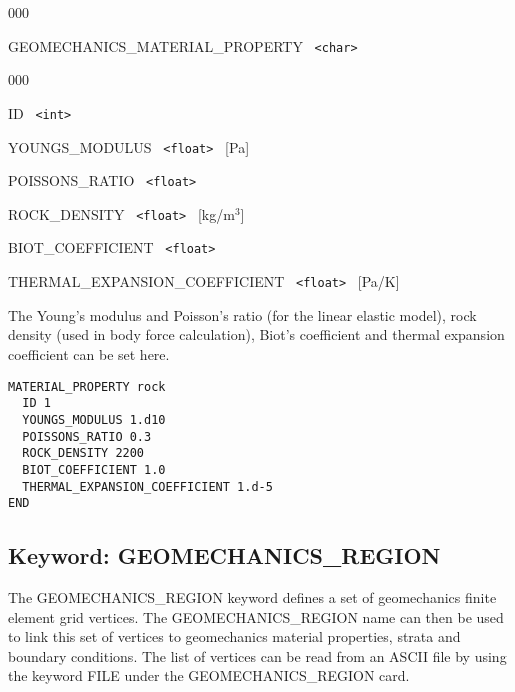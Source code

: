 \begin{deflist}{000}
\item[GEOMECHANICS\_MATERIAL\_PROPERTY] \ {\tt <char>}
\begin{deflist}{000}
\item[ID] \ {\tt <int>}
\item[YOUNGS\_MODULUS] \ {\tt <float>} \ [Pa]
\item[POISSONS\_RATIO] \ {\tt <float>}
\item[ROCK\_DENSITY] \ {\tt <float>} \ [kg/m$^3$]
\item[BIOT\_COEFFICIENT] \ {\tt <float>} 
\item[THERMAL\_EXPANSION\_COEFFICIENT] \ {\tt <float>} \ [Pa/K]
\end{deflist}
\item[\keyend]
\end{deflist}

 The Young's modulus and Poisson's ratio (for the linear elastic model), rock density (used in body force calculation), Biot's coefficient and thermal expansion coefficient can be set here.

\begin{mdframed}

\begin{verbatim}
MATERIAL_PROPERTY rock	 
  ID 1
  YOUNGS_MODULUS 1.d10
  POISSONS_RATIO 0.3
  ROCK_DENSITY 2200
  BIOT_COEFFICIENT 1.0
  THERMAL_EXPANSION_COEFFICIENT 1.d-5
END
\end{verbatim}

\end{mdframed}

\hyperlink{target_key}{\return}



\newpage
\protect\hypertarget{target_geomech_region}{}
 
\subsection{Keyword: GEOMECHANICS\_REGION}

 The GEOMECHANICS\_REGION keyword defines a set of geomechanics finite element grid vertices.
 The GEOMECHANICS\_REGION name can then be used to link this set of vertices to geomechanics  material properties, strata and boundary conditions. 
The list of vertices can be read from an ASCII file by using the keyword FILE under the GEOMECHANICS\_REGION card.

